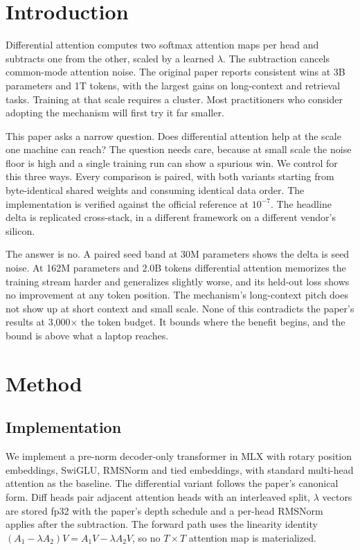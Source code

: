 
\section{Introduction}
Differential attention computes two softmax attention maps per head and
subtracts one from the other, scaled by a learned $\lambda$. The
subtraction cancels common-mode attention noise. The original
paper\supercite{ye2025differential} reports consistent wins at 3B
parameters and 1T tokens, with the largest gains on long-context and
retrieval tasks. Training at that scale requires a cluster. Most
practitioners who consider adopting the mechanism will first try it far
smaller.

This paper asks a narrow question. Does differential attention help at
the scale one machine can reach? The question needs care, because at
small scale the noise floor is high and a single training run can show
a spurious win. We control for this three ways. Every
comparison is paired, with both variants starting from byte-identical
shared weights and consuming identical data order. The implementation
is verified against the official reference at $10^{-7}$. The headline
delta is replicated cross-stack, in a different framework on a
different vendor's silicon.

The answer is no. A paired seed band at 30M parameters shows the
delta is seed noise. At 162M parameters and 2.0B tokens differential
attention memorizes the training stream harder and generalizes
slightly worse, and its held-out loss shows no improvement at any
token position. The mechanism's long-context pitch does not show up at
short context and small scale. None of this contradicts the paper's
results at 3,000$\times$ the token budget. It bounds where the benefit
begins, and the bound is above what a laptop reaches.

\section{Method}

\subsection{Implementation}
We implement a pre-norm decoder-only transformer in
MLX\supercite{mlx2023} with rotary position
embeddings\supercite{su2024roformer}, SwiGLU\supercite{shazeer2020glu},
RMSNorm\supercite{zhang2019rmsnorm} and tied embeddings, with standard
multi-head attention\supercite{vaswani2017attention} as the baseline.
The differential variant follows the paper's canonical form. Diff heads
pair adjacent attention heads with an interleaved split, $\lambda$
vectors are stored fp32 with the paper's depth schedule and a per-head
RMSNorm applies after the subtraction. The forward path uses the
linearity identity $(A_1 - \lambda A_2)V = A_1 V - \lambda A_2 V$, so
no $T \times T$ attention map is materialized.

